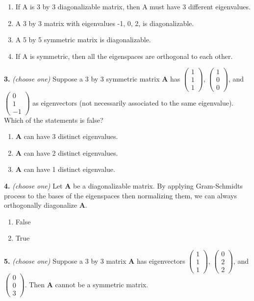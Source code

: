 \documentclass[10pt,a4paper]{article}
\begin{document}
\begin{enumerate}[label=(\Alph*)]
\item If A is 3 by 3 diagonalizable matrix, then A must have 3 different eigenvalues.
\item A 3 by 3 matrix with eigenvalues -1, 0, 2, is diagonalizable.
\item A 5 by 5 symmetric matrix is diagonalizable.
\item If A is symmetric, then all the eigenspaces are orthogonal to each other.
\end{enumerate}
\smallskip
\textbf{3.} \textit{(choose one)} Suppose a 3 by 3 symmetric matrix \(\mathbf{A}\) has \(\begin{pmatrix}1\\1\\1\end{pmatrix}\), \(\begin{pmatrix}1\\0\\0\end{pmatrix}\), and \(\begin{pmatrix}0\\1\\-1\end{pmatrix}\) as eigenvectors (not necessarily associated to the same eigenvalue). Which of the statements is false?

\begin{enumerate}[label=(\Alph*)]
\item \(\mathbf{A}\) can have 3 distinct eigenvalues.
\item \(\mathbf{A}\) can have 2 distinct eigenvalues.
\item \(\mathbf{A}\) can have 1 distinct eigenvalue.
\end{enumerate}
\smallskip
\textbf{4.} \textit{(choose one)} Let \(\mathbf{A}\) be a diagonalizable matrix. By applying Gram-Schmidts process to the bases of the eigenspaces then normalizing them,  we can always orthogonally diagonalize \(\mathbf{A}\).

\begin{enumerate}[label=(\Alph*)]
\item False
\item True
\end{enumerate}
\smallskip
\textbf{5.} \textit{(choose one)} Suppose a 3 by 3 matrix \(\mathbf{A}\) has eigenvectors \(\begin{pmatrix}1\\1\\1\end{pmatrix}\), \(\begin{pmatrix}0\\2\\2\end{pmatrix}\), and \(\begin{pmatrix}0\\0\\3\end{pmatrix}\). Then \(\mathbf{A}\) cannot be a symmetric matrix.
\end{document}
